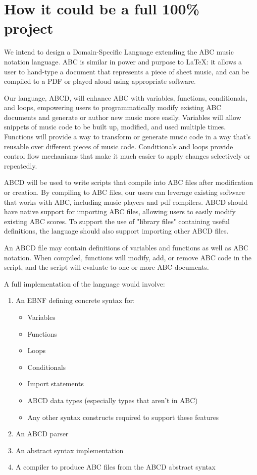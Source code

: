 \section{How it could be a full 100\% project}

We intend to design a Domain-Specific Language extending the ABC music notation language. ABC is similar in power and purpose to LaTeX: it allows a user to hand-type a document that represents a piece of sheet music, and can be compiled to a PDF or played aloud using appropriate software.

Our language, ABCD, will enhance ABC with variables, functions, conditionals, and loops, empowering users to programmatically modify existing ABC documents and generate or author new music more easily. Variables will allow snippets of music code to be built up, modified, and used multiple times. Functions will provide a way to transform or generate music code in a way that’s reusable over different pieces of music code. Conditionals and loops provide control flow mechanisms that make it much easier to apply changes selectively or repeatedly.

ABCD will be used to write scripts that compile into ABC files after modification or creation. By compiling to ABC files, our users can leverage existing software that works with ABC, including music players and pdf compilers. ABCD should have native support for importing ABC files, allowing users to easily modify existing ABC scores. To support the use of "library files" containing useful definitions, the language should also support importing other ABCD files.
	
An ABCD file may contain definitions of variables and functions as well as ABC notation. When compiled, functions will modify, add, or remove ABC code in the script, and the script will evaluate to one or more ABC documents. 

A full implementation of the language would involve:

\begin{enumerate}
\item An EBNF defining concrete syntax for:
\begin{itemize}
    \item Variables
    \item Functions
    \item Loops
    \item Conditionals 
    \item Import statements
    \item ABCD data types (especially types that aren’t in ABC)
    \item Any other syntax constructs required to support these features
\end{itemize} 
\item An ABCD parser
\item An abstract syntax implementation
\item A compiler to produce ABC files from the ABCD abstract syntax
\end{enumerate}

